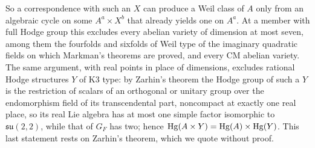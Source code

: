 So a correspondence with such an $X$ can produce a Weil class of $A$ only from
an algebraic cycle on some $A^{a}\times X^{b}$ that already yields one on
$A^{a}$. At a member with full Hodge group this excludes every abelian
variety of dimension at most seven, among them the fourfolds and sixfolds of
Weil type of the imaginary quadratic fields on which Markman's theorems are
proved, and every CM abelian variety. The same argument, with real points in
place of dimensions, excludes rational Hodge structures $Y$ of K3 type: by
Zarhin's theorem \cite{Zar83} the Hodge group of such a $Y$ is the restriction
of scalars of an orthogonal or unitary group over the endomorphism field of
its transcendental part, noncompact at exactly one real place, so its real Lie
algebra has at most one simple factor isomorphic to $\mathfrak{su}(2,2)$,
while that of $G_{F}$ has two; hence $\operatorname{Hg}(A\times Y)=\operatorname{Hg}(A)\times\operatorname{Hg}(Y)$.
This last statement rests on Zarhin's theorem, which we quote without proof.

